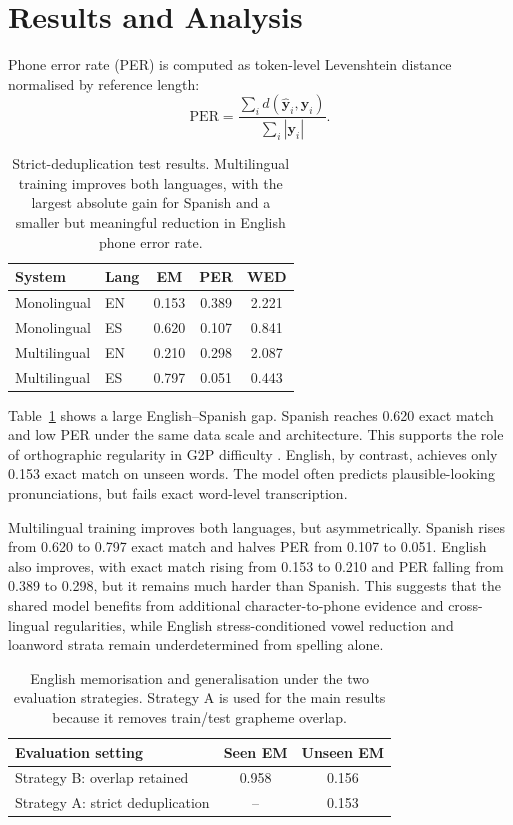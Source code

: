 \documentclass[11pt]{article}
\begin{document}
\section{Results and Analysis}
\label{sec:results}

Phone error rate (PER) is computed as token-level Levenshtein distance
normalised by reference length:
\begin{equation}
\label{eq:per}
\mathrm{PER}=\frac{\sum_i d(\hat{\mathbf{y}}_i,\mathbf{y}_i)}
{\sum_i |\mathbf{y}_i|}.
\end{equation}

\begin{table}[!htbp]
\centering
\small
\begin{tabular}{llccc}
\toprule
System & Lang & EM & PER & WED \\
\midrule
Monolingual & EN & 0.153 & 0.389 & 2.221 \\
Monolingual & ES & 0.620 & 0.107 & 0.841 \\
Multilingual & EN & 0.210 & 0.298 & 2.087 \\
Multilingual & ES & 0.797 & 0.051 & 0.443 \\
\bottomrule
\end{tabular}
\caption{Strict-deduplication test results. Multilingual training improves both
languages, with the largest absolute gain for Spanish and a smaller but
meaningful reduction in English phone error rate.}
\label{tab:results}
\end{table}

Table~\ref{tab:results} shows a large English--Spanish gap. Spanish reaches
0.620 exact match and low PER under the same data scale and architecture. This
supports the role of orthographic regularity in G2P difficulty
\citep{cheng2024survey}. English, by contrast, achieves only 0.153 exact match
on unseen words. The model often predicts plausible-looking pronunciations, but
fails exact word-level transcription.

Multilingual training improves both languages, but asymmetrically. Spanish
rises from 0.620 to 0.797 exact match and halves PER from 0.107 to 0.051.
English also improves, with exact match rising from 0.153 to 0.210 and PER
falling from 0.389 to 0.298, but it remains much harder than Spanish. This
suggests that the shared model benefits from additional character-to-phone
evidence and cross-lingual regularities, while English stress-conditioned vowel
reduction and loanword strata remain underdetermined from spelling alone.

\begin{table}[!htbp]
\centering
\small
\begin{tabular}{lcc}
\toprule
Evaluation setting & Seen EM & Unseen EM \\
\midrule
Strategy B: overlap retained & 0.958 & 0.156 \\
Strategy A: strict deduplication & -- & 0.153 \\
\bottomrule
\end{tabular}
\caption{English memorisation and generalisation under the two evaluation
strategies. Strategy A is used for the main results because it removes
train/test grapheme overlap.}
\label{tab:memorisation}
\end{table}
\end{document}
